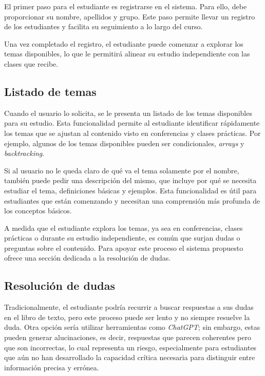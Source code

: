 El primer paso para el estudiante es registrarse en el sistema. Para ello, debe proporcionar su nombre, apellidos y grupo. Este paso permite llevar un registro de los estudiantes y facilita su seguimiento a lo largo del curso. 

Una vez completado el registro, el estudiante puede comenzar a explorar los temas disponibles, lo que le permitirá alinear su estudio independiente con las clases que recibe.

\subsection{Listado de temas}

Cuando el usuario lo solicita, se le presenta un listado de los temas disponibles para su estudio. Esta funcionalidad permite al estudiante identificar rápidamente los temas que se ajustan al contenido visto en conferencias y clases prácticas. Por ejemplo, algunos de los temas disponibles pueden ser condicionales, \textit{arrays} y \textit{backtracking}.

Si al usuario no le queda claro de qué va el tema solamente por el nombre, también puede pedir una descripción del mismo, que incluye por qué se necesita estudiar el tema, definiciones básicas y ejemplos. Esta funcionalidad es útil para estudiantes que están comenzando y necesitan una comprensión más profunda de los conceptos básicos.

A medida que el estudiante explora los temas, ya sea en conferencias, clases prácticas o durante su estudio independiente, es común que surjan dudas o preguntas sobre el contenido. Para apoyar este proceso el sistema propuesto ofrece una sección dedicada a la resolución de dudas.

\subsection{Resolución de dudas}

Tradicionalmente, el estudiante podría recurrir a buscar respuestas a sus dudas en el libro de texto, pero este proceso puede ser lento y no siempre resuelve la duda. Otra opción sería utilizar herramientas como \textit{ChatGPT}; sin embargo, estas pueden generar alucinaciones, es decir, respuestas que parecen coherentes pero que son incorrectas, lo cual representa un riesgo, especialmente para estudiantes que aún no han desarrollado la capacidad crítica necesaria para distinguir entre información precisa y errónea.

